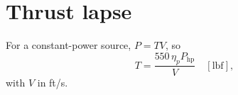 \documentclass[11pt]{article}
\begin{document}
\section*{Thrust lapse}
For a constant-power source, $P = TV$, so
\[ T = \frac{550\,\eta_p P_{\mathrm{hp}}}{V} \quad [\mathrm{lbf}], \]
with $V$ in ft/s.
\end{document}
